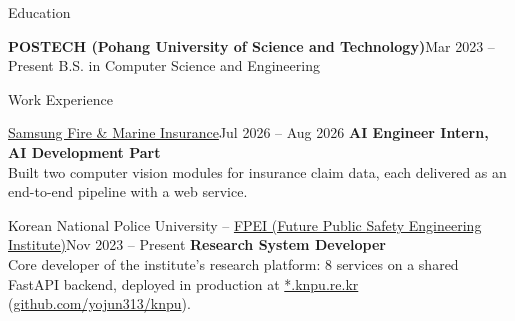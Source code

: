 \documentclass{resume}
\begin{document}
\begin{rSection}{Education}
	\begin{rEducation}{\textbf{POSTECH (Pohang University of Science and Technology)}}{Mar 2023 -- Present}
		B.S. in Computer Science and Engineering
	\end{rEducation}
\end{rSection}

\begin{rSection}{Work Experience}
	\begin{rSubsection}{\href{https://www.samsungfire.com}{Samsung Fire \& Marine Insurance}}{Jul 2026 -- Aug 2026}
		\textbf{AI Engineer Intern, AI Development Part}
		\\ [0.2em]
		Built two computer vision modules for insurance claim data, each delivered as an end-to-end pipeline with a web service.


	\end{rSubsection}

	\begin{rSubsection}{Korean National Police University -- \href{https://knpu.re.kr/}{FPEI (Future Public Safety Engineering Institute)}}{Nov 2023 -- Present}
		\textbf{Research System Developer}
		\\ [0.2em]
		Core developer of the institute's research platform: 8 services on a shared FastAPI backend, deployed in production at {\small\href{https://knpu.re.kr/systems}{*.knpu.re.kr}} ({\small\href{https://github.com/yojun313/knpu}{github.com/yojun313/knpu}}).


\end{rSubsection}
\end{rSection}
\end{document}
